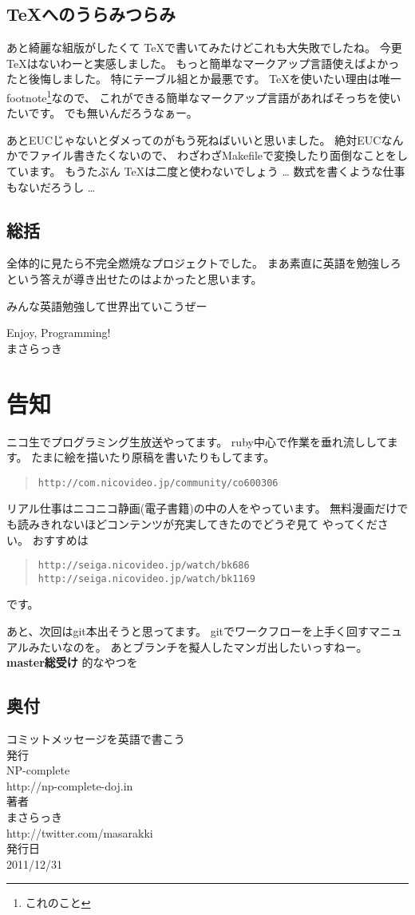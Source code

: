 \documentclass{jarticle}
\begin{document}
  \subsection*{\TeX へのうらみつらみ}
  あと綺麗な組版がしたくて \TeX で書いてみたけどこれも大失敗でしたね。
  今更 \TeX はないわーと実感しました。
  もっと簡単なマークアップ言語使えばよかったと後悔しました。
  特にテーブル組とか最悪です。
  \TeX を使いたい理由は唯一footnote\footnote{これのこと}なので、
  これができる簡単なマークアップ言語があればそっちを使いたいです。
  でも無いんだろうなぁー。

  あとEUCじゃないとダメってのがもう死ねばいいと思いました。
  絶対EUCなんかでファイル書きたくないので、
  わざわざMakefileで変換したり面倒なことをしています。
  もうたぶん \TeX は二度と使わないでしょう \dots
  数式を書くような仕事もないだろうし \dots

  \subsection*{総括}
  全体的に見たら不完全燃焼なプロジェクトでした。
  まあ素直に英語を勉強しろという答えが導き出せたのはよかったと思います。

  みんな英語勉強して世界出ていこうぜー

  \begin{flushright}
   Enjoy, Programming!\\
   \large{まさらっき}
  \end{flushright}

  \newpage
  \section*{告知}
  ニコ生でプログラミング生放送やってます。
  ruby中心で作業を垂れ流ししてます。
  たまに絵を描いたり原稿を書いたりもしてます。
  \begin{quote}
   {\tt http://com.nicovideo.jp/community/co600306}
  \end{quote}

  リアル仕事はニコニコ静画(電子書籍)の中の人をやっています。
  無料漫画だけでも読みきれないほどコンテンツが充実してきたのでどうぞ見て
  やってください。
  おすすめは
  \begin{quote}
   {\tt http://seiga.nicovideo.jp/watch/bk686}\\
   {\tt http://seiga.nicovideo.jp/watch/bk1169}
  \end{quote}
  です。

  あと、次回はgit本出そうと思ってます。
  gitでワークフローを上手く回すマニュアルみたいなのを。
  あとブランチを擬人したマンガ出したいっすねー。
   \huge{{\bf  master総受け}}
   \normalsize{的なやつを}

  \newpage
  \begin{center}
   \Large
   \section*{奥付}
   {\huge コミットメッセージを英語で書こう}
   \\[2.0cm]
   発行\\
   NP-complete\\
   http://np-complete-doj.in
   \\[1.5cm]
   著者\\
   まさらっき\\
   http://twitter.com/masarakki
   \\[2.5cm]
   発行日\\
   2011/12/31
  \end{center}
\end{document}
